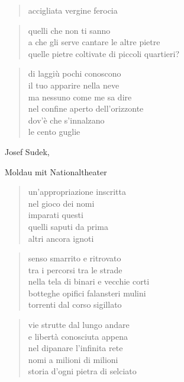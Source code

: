 	\begin{verse}
		accigliata vergine ferocia
	\end{verse}

	\begin{verse}
		quelli che non ti sanno\\
		a che gli serve cantare le altre pietre\\
		quelle pietre coltivate di piccoli quartieri?
	\end{verse}

	\begin{verse}
		di laggiù pochi conoscono\\
		il tuo apparire nella neve\\
		ma nessuno come me sa dire\\
		nel confine aperto dell’orizzonte\\
		dov’è che s’innalzano\\
		le cento guglie
	\end{verse}

\clearpage


\begin{artItem}
	Josef Sudek, \begin{otherlanguage}{german}%
		Moldau mit Nationaltheater%
	\end{otherlanguage}
\end{artItem}

	\begin{verse}
		un'appropriazione inscritta\\
		nel gioco dei nomi\\
		imparati questi\\
		quelli saputi da prima\\
		altri ancora ignoti
	\end{verse}

	\begin{verse}
		senso smarrito e ritrovato\\
		tra i percorsi tra le strade\\
		nella tela di binari e vecchie corti\\
		botteghe opifici falansteri mulini\\
		torrenti dal corso sigillato
	\end{verse}

	\begin{verse}
		vie strutte dal lungo andare\\
		e libertà conosciuta appena\\
		nel dipanare l'infinita rete\\
		nomi a milioni di milioni\\
		storia d'ogni pietra di selciato
	\end{verse}

